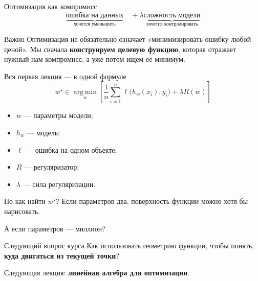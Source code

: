 \documentclass[aspectratio=169,10pt]{beamer}
\newcommand{\argmin}{\operatorname*{arg\,min}}
\newcommand{\loss}{\ell}
\begin{document}
\begin{frame}{Оптимизация как компромисс}
\centering
\vspace{0.6em}
\Large
\[
\underbrace{\text{ошибка на данных}}_{\text{хочется уменьшить}}
\quad+
\lambda
\underbrace{\text{сложность модели}}_{\text{хочется контролировать}}
\]
\normalsize
\vspace{1em}
\begin{block}{Важно}
Оптимизация не обязательно означает «минимизировать ошибку любой ценой». Мы сначала \textbf{конструируем целевую функцию}, которая отражает нужный нам компромисс, а уже потом ищем её минимум.
\end{block}
\end{frame}

\begin{frame}{Вся первая лекция --- в одной формуле}
\centering
\vspace{0.5em}
\[
\boxed{
  w^\star\in\argmin_w
  \left[
  \frac1n\sum_{i=1}^{n}
  \loss\bigl(h_w(x_i),y_i\bigr)
  +\lambda R(w)
  \right]
}
\]
\vspace{1em}
\begin{itemize}
  \item $w$ --- параметры модели;
  \item $h_w$ --- модель;
  \item $\loss$ --- ошибка на одном объекте;
  \item $R$ --- регуляризатор;
  \item $\lambda$ --- сила регуляризации.
\end{itemize}
\end{frame}

\begin{frame}{Но как найти $w^\star$?}
\centering
\Large
Если параметров два, поверхность функции можно хотя бы нарисовать.
\vspace{0.7em}

А если параметров --- миллион?
\vspace{1em}

\begin{alertblock}{Следующий вопрос курса}
\centering
Как использовать геометрию функции, чтобы понять, \textbf{куда двигаться из текущей точки}?
\end{alertblock}
\vspace{0.7em}
\normalsize
Следующая лекция: \textbf{линейная алгебра для оптимизации}.
\end{frame}
\end{document}

